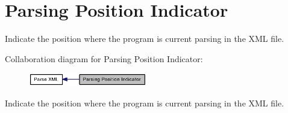 \section{Parsing Position Indicator}
\label{group____parsing__position__indicator}
Indicate the position where the program is current parsing in the XML file.  




Collaboration diagram for Parsing Position Indicator:\nopagebreak
\begin{figure}[H]
\begin{center}
\leavevmode
\includegraphics[width=146pt]{group____parsing__position__indicator}
\end{center}
\end{figure}
Indicate the position where the program is current parsing in the XML file. 
